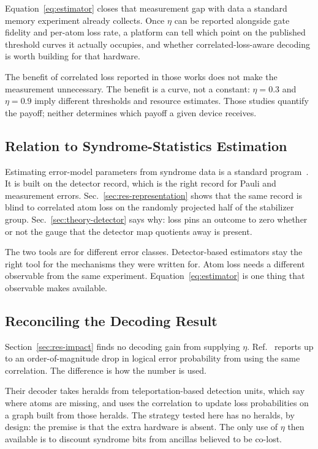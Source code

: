 \documentclass{ieeeaccess}
\begin{document}
Equation~\eqref{eq:estimator} closes that measurement gap with data a standard
memory experiment already collects. Once $\eta$ can be reported alongside gate
fidelity and per-atom loss rate, a platform can tell which point on the
published threshold curves it actually occupies, and whether
correlated-loss-aware decoding is worth building for that hardware.

The benefit of correlated loss reported in those works does not make the
measurement unnecessary. The benefit is a curve, not a constant: $\eta=0.3$ and
$\eta=0.9$ imply different thresholds and resource estimates. Those studies
quantify the payoff; neither determines which payoff a given device receives.

\subsection{Relation to Syndrome-Statistics Estimation}
\label{sec:disc-relation}

Estimating error-model parameters from syndrome data is a standard
program~\cite{spitz2018adaptiveweight,blumekohout2025detectorerrormodels}. It
is built on the detector record, which is the right record for Pauli and
measurement errors. Sec.~\ref{sec:res-representation} shows that the same
record is blind to correlated atom loss on the randomly projected half of the
stabilizer group. Sec.~\ref{sec:theory-detector} says why: loss pins an
outcome to zero whether or not the gauge that the detector map quotients away
is present.

The two tools are for different error classes. Detector-based estimators stay
the right tool for the mechanisms they were written for. Atom loss needs a
different observable from the same experiment. Equation~\eqref{eq:estimator}
is one thing that observable makes available.

\subsection{Reconciling the Decoding Result}
\label{sec:disc-decoding}

Section~\ref{sec:res-impact} finds no decoding gain from supplying $\eta$.
Ref.~\cite{perrin2026correlatedloss} reports up to an order-of-magnitude drop
in logical error probability from using the same correlation. The difference
is how the number is used.

Their decoder takes heralds from teleportation-based detection units, which
say where atoms are missing, and uses the correlation to update loss
probabilities on a graph built from those heralds. The strategy tested here
has no heralds, by design: the premise is that the extra hardware is absent.
The only use of $\eta$ then available is to discount syndrome bits from
ancillas believed to be co-lost.
\end{document}
